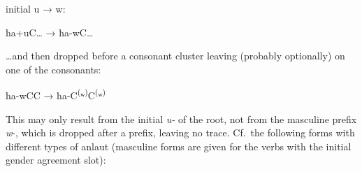 \documentclass[output=paper]{langsci/langscibook}
\begin{document}
\ex %
initial u → w:
\begin{center}
  ħa+uC\ldots{} → ħa-wC\ldots{}
\end{center}

\ex %
\ldots{}and then dropped before a consonant cluster leaving
(probably optionally)  on one of the consonants:

\begin{center}
  ħa-wCC → ħa-C\textsuperscript{(}ʷ\textsuperscript{)}C\textsuperscript{(}ʷ\textsuperscript{)}
\end{center}


\z

This  may only result from the initial \emph{u-} of the
root, not from the masculine prefix \emph{w}-, which is dropped after a
prefix, leaving no trace. Cf.\ the following forms with different types
of anlaut (masculine forms are given for the verbs with the initial
gender agreement slot):

\largerpage[1.25]
\end{document}
